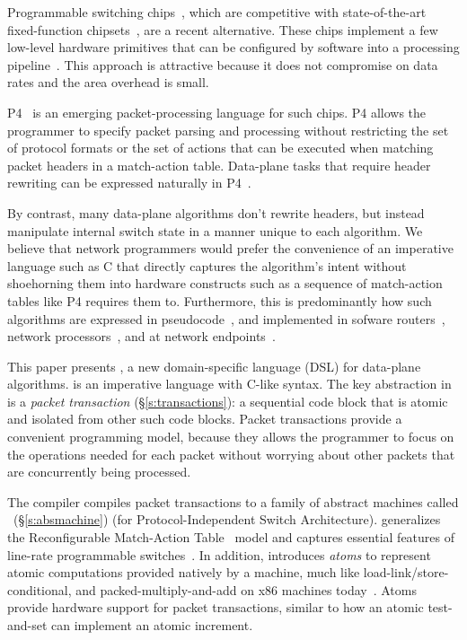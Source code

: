 Programmable switching chips~\cite{flexpipe, xpliant, rmt}, which are
competitive with state-of-the-art fixed-function chipsets~\cite{trident,
tomahawk, mellanox}, are a recent alternative.  These chips implement a few
low-level hardware primitives that can be configured by software into a
processing pipeline~\cite{xpliant_sdk,xpliant_sdk2,intel_sdk,rmt,p4}. This
approach is attractive because it does not compromise on data rates and the
area overhead is small.

P4~\cite{p4, p4spec} is an emerging packet-processing language for
such chips. P4 allows the programmer to specify packet parsing and
processing without restricting the set of protocol formats or the set
of actions that can be executed when matching packet headers in a
match-action table. Data-plane tasks that require header rewriting can
be expressed naturally in P4~\cite{dc_p4}.

By contrast, many data-plane algorithms don't rewrite headers, but instead
manipulate internal switch state in a manner unique to each algorithm. We
believe that network programmers would prefer the convenience of an imperative
language such as C that directly captures the algorithm's intent without
shoehorning them into hardware constructs such as a sequence of match-action
tables like P4 requires them to.  Furthermore, this is predominantly how such
algorithms are expressed in pseudocode~\cite{red, csfq, codel_code, avq, blue},
and implemented in sofware routers~\cite{click, dpdk, routebricks}, network
processors~\cite{packetc, nova}, and at network endpoints~\cite{qdisc}.

This paper presents \pktlanguage, a new domain-specific language (DSL) for
data-plane algorithms.  \pktlanguage is an imperative language with C-like
syntax. The key abstraction in \pktlanguage is a {\em packet transaction}
(\S\ref{s:transactions}): a sequential code block that is atomic and isolated
from other such code blocks. Packet transactions provide a convenient
programming model, because they allows the programmer to focus on the
operations needed for each packet without worrying about other packets that are
concurrently being processed.

The \pktlanguage compiler compiles packet transactions to a family of
abstract machines called \absmachine~(\S\ref{s:absmachine}) (for
Protocol-Independent Switch Architecture). \absmachine generalizes the
Reconfigurable Match-Action Table~\cite{rmt} model and captures essential
features of line-rate programmable switches~\cite{rmt, xpliant, flexpipe}. In
addition, \absmachine introduces {\em atoms} to represent atomic computations
provided natively by a \absmachine machine, much like
load-link/store-conditional, and packed-multiply-and-add on x86 machines
today~\cite{x86_manual}.  Atoms provide hardware support for packet
transactions, similar to how an atomic test-and-set can implement an atomic
increment.

